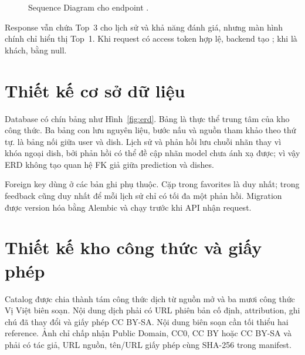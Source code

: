 \begin{figure}[htbp]
\centering
\resizebox{0.96\textwidth}{!}{}
\caption{Sequence Diagram cho endpoint .}
\label{fig:sequence}
\end{figure}

Response vẫn chứa Top~3 cho lịch sử và khả năng đánh giá, nhưng màn hình
chính chỉ hiển thị Top~1. Khi request có access token hợp lệ, backend tạo
; khi là khách,  bằng null.

\clearpage
\section{Thiết kế cơ sở dữ liệu}

Database có chín bảng như Hình~\ref{fig:erd}. Bảng  là thực thể
trung tâm của kho công thức. Ba bảng con lưu nguyên liệu, bước nấu và nguồn
tham khảo theo thứ tự.  là bảng nối giữa user và dish. Lịch
sử và phản hồi lưu chuỗi nhãn thay vì khóa ngoại dish, bởi phản hồi có thể
đề cập nhãn model chưa ánh xạ được; vì vậy ERD không tạo quan hệ FK giả giữa
prediction và dishes.

\clearpage
\thispagestyle{dau}
\vspace*{\fill}
\begin{center}
\resizebox{\textwidth}{!}{}
\end{center}
\vspace*{\fill}
\clearpage

Foreign key dùng  ở các bản ghi phụ thuộc. Cặp
 trong favorites là duy nhất; 
trong feedback cũng duy nhất để mỗi lịch sử chỉ có tối đa một phản hồi.
Migration được version hóa bằng Alembic và chạy trước khi API nhận request.

\section{Thiết kế kho công thức và giấy phép}

Catalog được chia thành tám công thức dịch từ nguồn mở và ba mươi công thức
Vị Việt biên soạn. Nội dung dịch phải có URL phiên bản cố định, attribution,
ghi chú đã thay đổi và giấy phép CC BY-SA. Nội dung biên soạn cần tối thiểu
hai reference. Ảnh chỉ chấp nhận Public Domain, CC0, CC BY hoặc CC BY-SA và
phải có tác giả, URL nguồn, tên/URL giấy phép cùng SHA-256 trong manifest.

